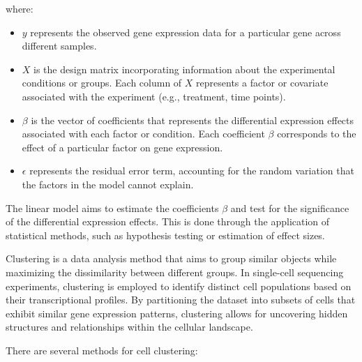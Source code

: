 \documentclass[aps,prb,twocolumn,superscriptaddress,floatfix,longbibliography]{revtex4-2}
\newif\ifptitle
\newif\ifpnumber
\newcounter{para}
\newcommand\ptitle[1]{\par\refstepcounter{para}
{\ifpnumber{\noindent\textcolor{lightgray}{\textbf{\thepara}}\indent}\fi}
{\ifptitle{\textbf{[{#1}]}}\fi}}
\begin{document}
where:

\begin{itemize}
\item $y$ represents the observed gene expression data for a particular gene across different samples.
\item $X$ is the design matrix incorporating information about the experimental conditions or groups. Each column of $X$ represents a factor or covariate associated with the experiment (e.g., treatment, time points).
\item $\beta$  is the vector of coefficients that represents the differential expression effects associated with each factor or condition. Each coefficient $\beta$ corresponds to the effect of a particular factor on gene expression.
\item $\epsilon$ represents the residual error term, accounting for the random variation that the factors in the model cannot explain.
\end{itemize}

The linear model aims to estimate the coefficients $\beta$ and test for the significance of the differential expression effects. This is done through the application of statistical methods, such as hypothesis testing or estimation of effect sizes.

\ptitle{Cell clustering} \cite{clustering} Clustering is a data analysis method that aims to group similar objects while maximizing the dissimilarity between different groups. In single-cell sequencing experiments, clustering is employed to identify distinct cell populations based on their transcriptional profiles. By partitioning the dataset into subsets of cells that exhibit similar gene expression patterns, clustering allows for uncovering hidden structures and relationships within the cellular landscape.

There are several methods for cell clustering:
\end{document}
